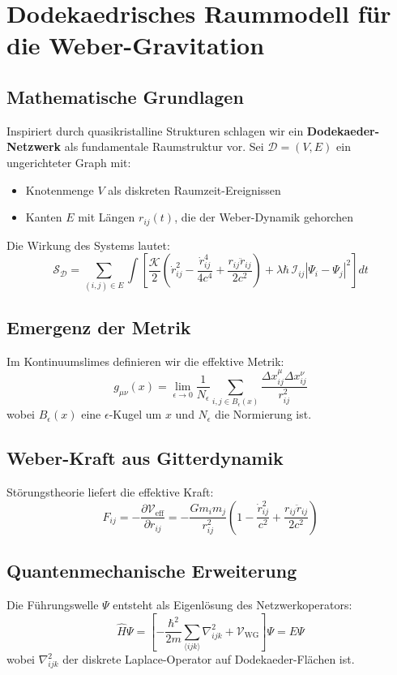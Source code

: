 \newpage
\section{Dodekaedrisches Raummodell für die Weber-Gravitation}
\subsection{Mathematische Grundlagen}
Inspiriert durch quasikristalline Strukturen schlagen wir ein \textbf{Dodekaeder-Netzwerk} als fundamentale Raumstruktur vor. Sei $\mathcal{D} = (V,E)$ ein ungerichteter Graph mit:

\begin{itemize}
\item Knotenmenge $V$ als diskreten Raumzeit-Ereignissen
\item Kanten $E$ mit Längen $r_{ij}(t)$, die der Weber-Dynamik gehorchen
\end{itemize}

Die Wirkung des Systems lautet:
\begin{equation}
\mathcal{S}_{\mathcal{D}} = \sum_{(i,j)\in E} \int \left[ 
\frac{\mathcal{K}}{2} \left( \dot{r}_{ij}^2 - \frac{\dot{r}_{ij}^4}{4c^4} + \frac{r_{ij}\ddot{r}_{ij}}{2c^2} \right) 
+ \lambda \hbar \, \mathcal{I}_{ij} |\Psi_i - \Psi_j|^2 
\right] dt
\end{equation}

\subsection{Emergenz der Metrik}
Im Kontinuumslimes definieren wir die effektive Metrik:
\begin{equation}
g_{\mu\nu}(x) = \lim_{\epsilon \to 0} \frac{1}{N_\epsilon} \sum_{i,j \in B_\epsilon(x)} \frac{\Delta x_{ij}^\mu \Delta x_{ij}^\nu}{r_{ij}^2}
\end{equation}
wobei $B_\epsilon(x)$ eine $\epsilon$-Kugel um $x$ und $N_\epsilon$ die Normierung ist.

\subsection{Weber-Kraft aus Gitterdynamik}
Störungstheorie liefert die effektive Kraft:
\begin{equation}
F_{ij} = -\frac{\partial \mathcal{V}_{\text{eff}}}{\partial r_{ij}} = -\frac{G m_i m_j}{r_{ij}^2} \left(1 - \frac{\dot{r}_{ij}^2}{c^2} + \frac{r_{ij}\ddot{r}_{ij}}{2c^2}\right)
\end{equation}

\subsection{Quantenmechanische Erweiterung}
Die Führungswelle $\Psi$ entsteht als Eigenlösung des Netzwerkoperators:
\begin{equation}
\hat{H} \Psi = \left[ -\frac{\hbar^2}{2m} \sum_{\langle ijk \rangle} \nabla_{ijk}^2 + \mathcal{V}_{\text{WG}} \right] \Psi = E \Psi
\end{equation}
wobei $\nabla_{ijk}^2$ der diskrete Laplace-Operator auf Dodekaeder-Flächen ist.
